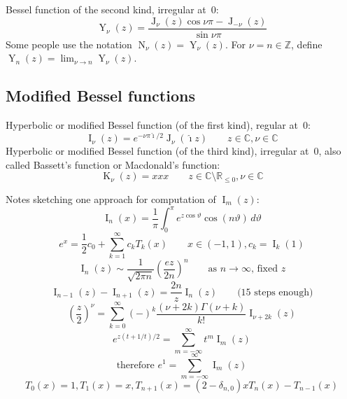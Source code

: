 \documentclass[10pt,dvipdfmx,letterpaper,twoside]{article}
\let\O=\operatorname
\newcommand{\RR}{{\mathbb{R}}}
\newcommand{\CC}{{\mathbb{C}}}
\newcommand{\ZZ}{{\mathbb{Z}}}
\newcommand{\ii}{{\hat{\imath}}}
\let\Gam=\Gamma
\let\theta=\vartheta
\begin{document}
Bessel function of the second kind, irregular at~$0$:
\[ \O{Y}_\nu(z) = \frac{\O{J}_\nu(z)\cos\nu\pi - \O{J}_{-\nu}(z)}{\sin \nu\pi} \]
Some people use the notation $\O{N}_\nu(z) = \O{Y}_\nu(z)$.
For $\nu=n\in\ZZ$, define $\O{Y}_n(z) = \lim_{\nu\to n}\O{Y}_\nu(z)$.

\subsection{Modified Bessel functions}

Hyperbolic or modified Bessel function (of the first kind), regular at~$0$:
\[ \O{I}_\nu(z) = e^{-\nu\pi\ii/2} \O{J}_\nu(\ii z) \qquad z\in\CC, \nu\in\CC \]
Hyperbolic or modified Bessel function (of the third kind), irregular at~$0$, also called Bassett's function or Macdonald's function:
\[ \O{K}_\nu(z) = xxx \qquad z\in\CC\setminus\RR_{\leq0}, \nu\in\CC \]

Notes sketching one approach for computation of $\O{I}_m(z)$:
\[ \O{I}_n(x) = \frac{1}{\pi} \int_0^\pi e^{z\cos\theta} \cos(n\theta)\,d\theta \]
\[ e^{x} = \frac12 c_0 + \sum_{k=1}^\infty c_k T_k(x) \qquad x\in(-1,1), c_k = \O{I}_k(1) \]
\[ \O{I}_n(z) \sim \frac{1}{\sqrt{2\pi n}}\left(\frac{ez}{2n}\right)^n \qquad\text{as $n\to\infty$, fixed $z$} \]
\[ \O{I}_{n-1}(z) - \O{I}_{n+1}(z) = \frac{2n}{z} \O{I}_n(z) \qquad\text{(15 steps enough)} \]
\[ \left(\frac{z}{2}\right)^{\nu} = \sum_{k=0}^\infty(-)^k \frac{(\nu+2k)\Gam(\nu+k)}{k!} \O{I}_{\nu+2k}(z) \]
\[ e^{z(t+1/t)/2} = \sum_{m=-\infty}^\infty t^m \O{I}_m(z) \]
\[ \text{therefore\ } e^1 = \sum_{m=-\infty}^\infty \O{I}_m(z) \]
\[ T_0(x) = 1, T_1(x) = x, T_{n+1}(x) = (2-\delta_{n,0})x T_{n}(x) - T_{n-1}(x) \]
\end{document}
